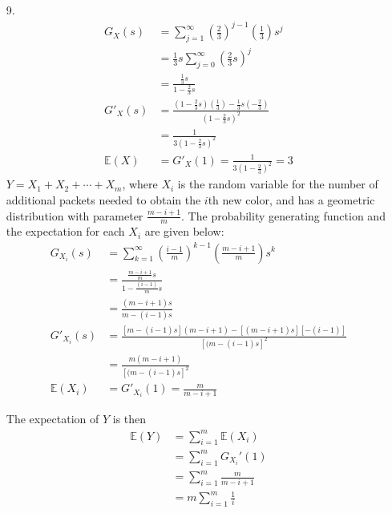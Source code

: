 \documentclass[a4paper,12pt]{article}
\begin{document}
\begin{enumerate}
    \item[9.] 
        \begin{align*}
            G_X(s) &= \sum_{j = 1}^{\infty} \left( \frac{2}{3} \right)^{j - 1} \left( \frac{1}{3} \right) s^j \\
            &= \frac{1}{3} s \sum_{j = 0}^{\infty} \left( \frac{2}{3} s \right)^j \\
            &= \frac{\frac{1}{3} s}{1 - \frac{2}{3}s} \\
            G'_X(s) &= \frac{\left( 1 - \frac{2}{3}s \right) \left( \frac{1}{3} \right) - \frac{1}{3} s \left(-\frac{2}{3} \right)}{\left( 1 - \frac{2}{3} s \right)^2} \\
            &= \frac{1}{3 \left(1 - \frac{2}{3}s \right)^2} \\
            \mathbb{E}(X) &= G'_X(1) = \frac{1}{3 \left( 1 - \frac{2}{3} \right)^2} = 3
        \end{align*}
        $Y = X_1 + X_2 + \cdots + X_m$, where $X_i$ is the random variable for the number of additional packets needed to obtain the $i$th new color, and has a geometric distribution with parameter $\frac{m - i + 1}{m}$. The probability generating function and the expectation for each $X_i$ are given below:
        \begin{align*}
            G_{X_i}(s) &= \sum_{k = 1}^\infty \left( \frac{i - 1}{m} \right)^{k - 1} \left( \frac{m - i + 1}{m} \right) s^k \\
            &= \frac{\frac{m - i + 1}{m} s}{1 - \frac{(i - 1)}{m} s} \\
            &= \frac{(m - i + 1)s}{m - (i - 1)s} \\
            G'_{X_i}(s) &= \frac{[m - (i - 1)s](m - i + 1) - [(m - i + 1)s][-(i - 1)]}{[(m - (i - 1)s]^2} \\
            &= \frac{m(m - i + 1)}{[(m - (i - 1)s]^2} \\
            \mathbb{E}(X_i) &= G'_{X_i}(1) = \frac{m}{m - i + 1}
        \end{align*}
        \iffalse
        Because each $X_i$ is independent, $Y$ has the probability generating function
        \begin{align*}
            G_Y(s) &= \prod_{i = 1}^{m} G_{X_i}(s) = \prod_{i = 1}^{m} \frac{m - i + 1}{m - (i - 1)s}
        \end{align*}
        for all values of $s$ in which the series converges, and the expectation is
        \fi
        The expectation of $Y$ is then
        \begin{align*}
            \mathbb{E}(Y) &= \sum_{i = 1}^m \mathbb{E} (X_i) \\
            &= \sum_{i = 1}^m G_{X_i}'(1) \\
            &= \sum_{i = 1}^m \frac{m}{m - i + 1} \\
            &= m \sum_{i = 1}^m \frac{1}{i}
        \end{align*}


\end{enumerate}
\end{document}

